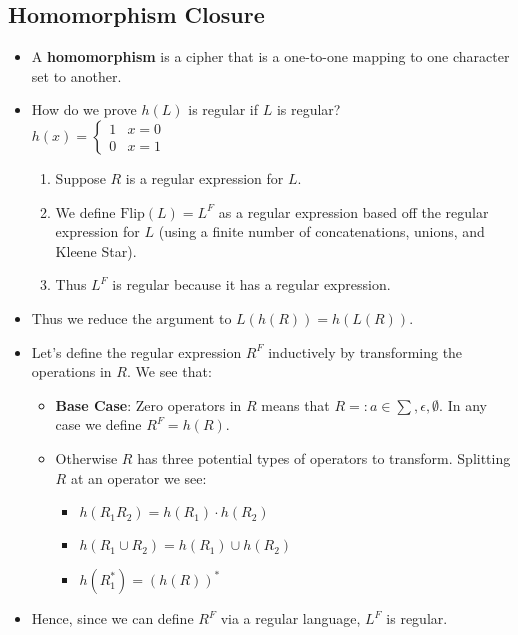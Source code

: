 \documentclass[12pt]{article}
\begin{document}
\subsection{Homomorphism Closure}
\begin{itemize}
    \item A \textbf{homomorphism} is a cipher that is a one-to-one mapping to one character set to another.
    \item How do we prove $h(L)$ is regular if $L$ is regular? \\
    $
    h(x) = \begin{cases}
        1 & x = 0 \\
        0 & x = 1
    \end{cases}
    $
    \begin{enumerate}
        \item Suppose $R$ is a regular expression for $L$.
        \item We define $\text{Flip}(L) = L^F$ as a regular expression based off the regular expression for $L$ (using a finite number of concatenations, unions, and Kleene Star).
        \item Thus $L^F$ is regular because it has a regular expression.
    \end{enumerate}
    \item Thus we reduce the argument to $L(h(R)) = h(L(R))$.
    \item Let's define the regular expression $R^F$ inductively by transforming the operations in $R$. We see that:
    \begin{itemize}
        \item \textbf{Base Case}: Zero operators in $R$ means that $R =: a \in \sum, \epsilon, \emptyset$. In any case we define $R^F = h(R)$.
        \item Otherwise $R$ has three potential types of operators to transform. Splitting $R$ at an operator we see:
        \begin{itemize}
            \item $h(R_1 R_2) = h(R_1) \cdot h(R_2)$
            \item $h(R_1 \cup R_2) = h(R_1) \cup h(R_2)$
            \item $h(R_1^{\ast}) = (h(R))^{\ast}$
        \end{itemize}
    \end{itemize}
    \item Hence, since we can define $R^F$ via a regular language, $L^F$ is regular.
\end{itemize}
\end{document}
